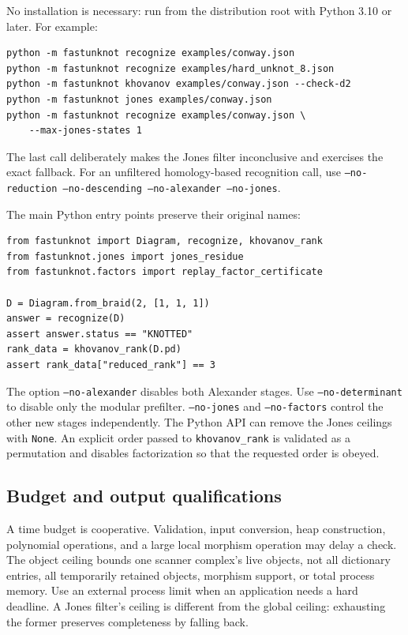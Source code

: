 \documentclass[11pt,letterpaper]{article}
\theoremstyle{definition}
\begin{document}
No installation is necessary: run from the distribution root with Python 3.10
or later. For example:
\par\medskip\noindent\begin{minipage}{\linewidth}
\begin{lstlisting}
python -m fastunknot recognize examples/conway.json
python -m fastunknot recognize examples/hard_unknot_8.json
python -m fastunknot khovanov examples/conway.json --check-d2
python -m fastunknot jones examples/conway.json
python -m fastunknot recognize examples/conway.json \
    --max-jones-states 1
\end{lstlisting}
\end{minipage}\par\medskip
The last call deliberately makes the Jones filter inconclusive and exercises
the exact fallback. For an unfiltered homology-based recognition call, use
\texttt{--no-reduction --no-descending --no-alexander --no-jones}.

The main Python entry points preserve their original names:
\par\medskip\noindent\begin{minipage}{\linewidth}
\begin{lstlisting}
from fastunknot import Diagram, recognize, khovanov_rank
from fastunknot.jones import jones_residue
from fastunknot.factors import replay_factor_certificate

D = Diagram.from_braid(2, [1, 1, 1])
answer = recognize(D)
assert answer.status == "KNOTTED"
rank_data = khovanov_rank(D.pd)
assert rank_data["reduced_rank"] == 3
\end{lstlisting}
\end{minipage}\par\medskip

The option \texttt{--no-alexander} disables both Alexander stages. Use
\texttt{--no-determinant} to disable only the modular prefilter.
\texttt{--no-jones} and \texttt{--no-factors} control the other new stages
independently. The Python API can remove the Jones ceilings with \texttt{None}.
An explicit order passed to \texttt{khovanov\_rank} is validated as a permutation
and disables factorization so that the requested order is obeyed.

\subsection{Budget and output qualifications}

A time budget is cooperative. Validation, input conversion, heap construction,
polynomial operations, and a large local morphism operation may delay a check.
The object ceiling bounds one scanner complex's live objects, not all dictionary
entries, all temporarily retained objects, morphism support, or total process
memory. Use an external process limit when an application needs a hard deadline.
A Jones filter's ceiling is different from the global ceiling: exhausting the
former preserves completeness by falling back.
\end{document}
